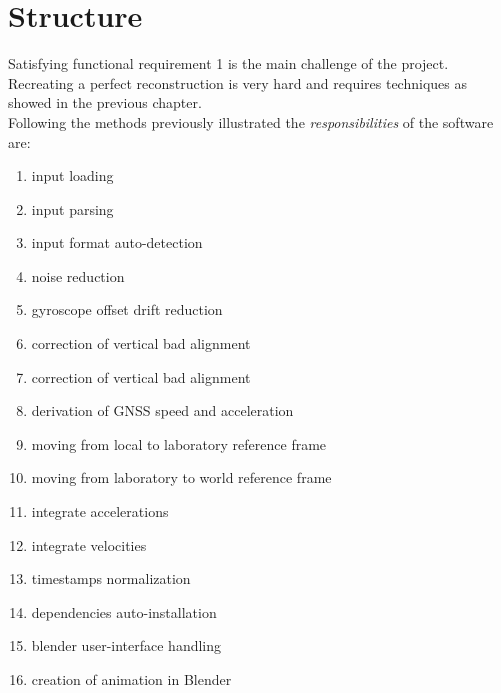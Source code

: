 \section{Structure}
Satisfying functional requirement 1 is the main challenge of the project. Recreating a perfect reconstruction is very hard and requires techniques as showed in the previous chapter. \\
Following the methods previously illustrated the \textit{responsibilities} of the software are:
\begin{enumerate}
\item input loading
\item input parsing
\item input format auto-detection
\item noise reduction
\item gyroscope offset drift reduction
\item correction of vertical bad alignment
\item correction of vertical bad alignment
\item derivation of GNSS speed and acceleration
\item moving from local to laboratory reference frame
\item moving from laboratory to world reference frame
\item integrate accelerations
\item integrate velocities
\item timestamps normalization
\item dependencies auto-installation
\item blender user-interface handling
\item creation of animation in Blender
\end{enumerate}

